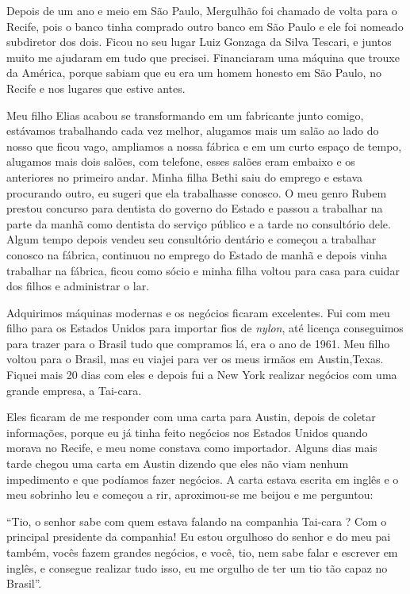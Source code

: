 Depois de um ano e meio em São Paulo, Mergulhão foi chamado de volta
para o Recife, pois o banco tinha comprado outro banco em São Paulo e
ele foi nomeado subdiretor dos dois. Ficou no seu lugar Luiz Gonzaga da
Silva Tescari, e juntos muito me ajudaram em tudo que precisei.
Financiaram uma máquina que trouxe da América, porque sabiam que eu era
um homem honesto em São Paulo, no Recife e nos lugares que estive antes.

Meu filho Elias acabou se transformando em um fabricante junto comigo,
estávamos trabalhando cada vez melhor, alugamos mais um salão ao lado do
nosso que ficou vago, ampliamos a nossa fábrica e em um curto espaço de
tempo, alugamos mais dois salões, com telefone, esses salões eram
embaixo e os anteriores no primeiro andar. Minha filha Bethi saiu do
emprego e estava procurando outro, eu sugeri que ela trabalhasse
conosco. O meu genro Rubem prestou concurso para dentista do governo do
Estado e passou a trabalhar na parte da manhã como dentista do serviço
público e a tarde no consultório dele. Algum tempo depois vendeu seu
consultório dentário e começou a trabalhar conosco na fábrica, continuou
no emprego do Estado de manhã e depois vinha trabalhar na fábrica, ficou
como sócio e minha filha voltou para casa para cuidar dos filhos e
administrar o lar.

Adquirimos máquinas modernas e os negócios ficaram excelentes. Fui com
meu filho para os Estados Unidos para importar fios de \textit{nylon}, até
licença conseguimos para trazer para o Brasil tudo que compramos lá, era
o ano de 1961. Meu filho voltou para o Brasil, mas eu viajei para ver os
meus irmãos em Austin,Texas. Fiquei mais 20 dias com eles e depois fui a
New York realizar negócios com uma grande empresa, a Tai-cara.

Eles ficaram de me responder com uma carta para Austin, depois de
coletar informações, porque eu já tinha feito negócios nos Estados
Unidos quando morava no Recife, e meu nome constava como importador.
Alguns dias mais tarde chegou uma carta em Austin dizendo que eles não
viam nenhum impedimento e que podíamos fazer negócios. A carta estava
escrita em inglês e o meu sobrinho leu e começou a rir, aproximou-se me
beijou e me perguntou:

``Tio, o senhor sabe com quem estava falando na companhia Tai-cara ? Com
o principal presidente da companhia! Eu estou orgulhoso do senhor e do
meu pai também, vocês fazem grandes negócios, e você, tio, nem sabe
falar e escrever em inglês, e consegue realizar tudo isso, eu me orgulho
de ter um tio tão capaz no Brasil''.


